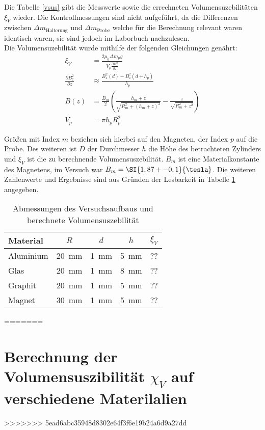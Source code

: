 Die Tabelle \ref{vsus} gibt die Messwerte sowie die errechneten Volumensuzebilitäten $\xi_V$ wieder. Die Kontrollmessungen sind nicht aufgeführt, da die Differenzen zwischen $\Delta m_{\textrm{Halterung}}$ und $\Delta m_{\textrm{Probe}}$ welche für die Berechnung relevant waren identisch waren, sie sind jedoch im Laborbuch nachzulesen.\\
Die Volumensuzebilität wurde mithilfe der folgenden Gleichungen genährt:
\begin{align}
	\xi_V &= \frac{2 \mu_0 \Delta m_p g}{V_p \frac{\partial B_z^2}{\partial z}}
	\\
	\frac{\partial B_z^2}{\partial z} &\approx \frac{B_z^2(d)-B_z^2(d+h_p)}{h_p}
	\\
	B(z) &=\frac{B_m}{2}\left( \frac{h_m+z}{\sqrt{R_m^2+(h_m+z)^2}}- \frac{z}{\sqrt{R_m^2+z^2}}\right)\\
	V_p &=\pi h_p R_p^2 
\end{align}

Größen mit Index $m$ beziehen sich hierbei auf den Magneten, der Index $p$ auf die Probe. Des weiteren ist $D$ der Durchmesser $h$ die Höhe des betrachteten Zylinders und $\xi_V$ ist die zu berechnende Volumensuszebilität. $B_m$ ist eine Materialkonstante des Magnetens, im Versuch war $B_m=\SI{1,87+-0,1}{\tesla}$. Die weiteren Zahlenwerte und Ergebnisse sind aus Gründen der Lesbarkeit in Tabelle \ref{berechnung} angegeben.





\begin{table}
	\caption{Abmessungen des Versuchsaufbaus und berechnete Volumensuszebilität}
	\begin{center}
		
		
		\begin{tabular}{|l|c|c|c|c|}
			
			\hline
			Material& $R$ & $d$ & $h$ & $\xi_V$\\
			\hline
			Aluminium &\SI{20}{mm}&\SI{1}{mm}&\SI{5}{mm}& ??\\
			\hline
			Glas &\SI{20}{mm}&\SI{1}{mm}&\SI{8}{mm}& ??\\
			 \hline
			Graphit &\SI{20}{mm}&\SI{1}{mm}&\SI{5}{mm}& ??\\
			\hline
			Magnet &\SI{30}{mm}&\SI{1}{mm}&\SI{5}{mm}& ??\\
			\hline
		\end{tabular}
	\end{center}
	\label{berechnung}
	
\end{table}






=======
\section{Berechnung der Volumensuszibilität $\chi_V$ auf verschiedene Materilalien}
>>>>>>> 5ead6abc35948d8302e64f3f6e19b24a6d9a27dd

